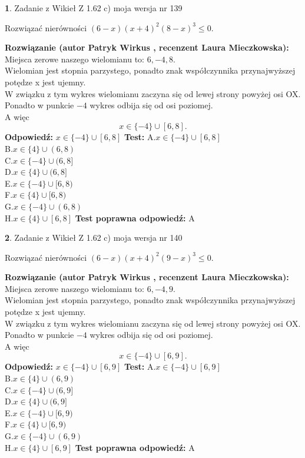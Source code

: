 \documentclass[12pt, a4paper]{article}
\theoremstyle{definition} %
\newtheorem{zad}{}
\newcommand{\zadStart}[1]{\begin{zad}#1\newline}
\newcommand{\zadStop}{\end{zad}}
\newcommand{\rozwStart}[2]{\noindent \textbf{Rozwiązanie (autor #1 , recenzent #2): }\newline}
\newcommand{\rozwStop}{\newline}
\newcommand{\odpStart}{\noindent \textbf{Odpowiedź:}\newline}
\newcommand{\odpStop}{\newline}
\newcommand{\testStart}{\noindent \textbf{Test:}\newline}
\newcommand{\testStop}{\newline}
\newcommand{\kluczStart}{\noindent \textbf{Test poprawna odpowiedź:}\newline}
\newcommand{\kluczStop}{\newline}
\begin{document}
\zadStart{Zadanie z Wikieł Z 1.62 c) moja wersja nr 139}

Rozwiązać nierówności $(6-x)(x+4)^{2}(8-x)^{3}\le0$.
\zadStop
\rozwStart{Patryk Wirkus}{Laura Mieczkowska}
Miejsca zerowe naszego wielomianu to: $6, -4, 8$.\\
Wielomian jest stopnia parzystego, ponadto znak współczynnika przy\linebreak najwyższej potędze x jest ujemny.\\ W związku z tym wykres wielomianu zaczyna się od lewej strony powyżej osi OX.\\
Ponadto w punkcie $-4$ wykres odbija się od osi poziomej.\\
A więc $$x \in \{-4\} \cup [6,8].$$
\rozwStop
\odpStart
$x \in \{-4\} \cup [6,8]$
\odpStop
\testStart
A.$x \in \{-4\} \cup [6,8]$\\
B.$x \in \{4\} \cup (6,8)$\\
C.$x \in \{-4\} \cup (6,8]$\\
D.$x \in \{4\} \cup (6,8]$\\
E.$x \in \{-4\} \cup [6,8)$\\
F.$x \in \{4\} \cup [6,8)$\\
G.$x \in \{-4\} \cup (6,8)$\\
H.$x \in \{4\} \cup [6,8]$
\testStop
\kluczStart
A
\kluczStop



\zadStart{Zadanie z Wikieł Z 1.62 c) moja wersja nr 140}

Rozwiązać nierówności $(6-x)(x+4)^{2}(9-x)^{3}\le0$.
\zadStop
\rozwStart{Patryk Wirkus}{Laura Mieczkowska}
Miejsca zerowe naszego wielomianu to: $6, -4, 9$.\\
Wielomian jest stopnia parzystego, ponadto znak współczynnika przy\linebreak najwyższej potędze x jest ujemny.\\ W związku z tym wykres wielomianu zaczyna się od lewej strony powyżej osi OX.\\
Ponadto w punkcie $-4$ wykres odbija się od osi poziomej.\\
A więc $$x \in \{-4\} \cup [6,9].$$
\rozwStop
\odpStart
$x \in \{-4\} \cup [6,9]$
\odpStop
\testStart
A.$x \in \{-4\} \cup [6,9]$\\
B.$x \in \{4\} \cup (6,9)$\\
C.$x \in \{-4\} \cup (6,9]$\\
D.$x \in \{4\} \cup (6,9]$\\
E.$x \in \{-4\} \cup [6,9)$\\
F.$x \in \{4\} \cup [6,9)$\\
G.$x \in \{-4\} \cup (6,9)$\\
H.$x \in \{4\} \cup [6,9]$
\testStop
\kluczStart
A
\kluczStop
\end{document}
